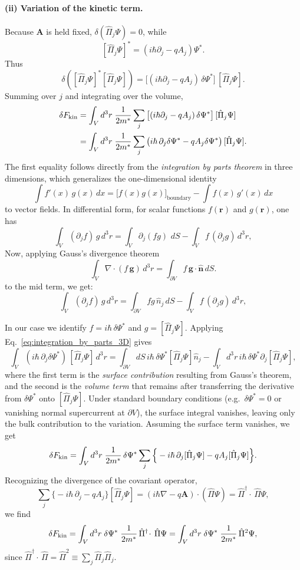 \paragraph{(ii) Variation of the kinetic term.}
Because $\mathbf A$ is held fixed, $\delta(\hat\Pi_j\Psi)=0$, while
\[
[\hat\Pi_j \Psi]^* = (i\hbar \partial_j - q A_j)\Psi^* .
\]
Thus
\[
\delta \left( [\hat\Pi_j\Psi]^* [\hat\Pi_j\Psi] \right)
= \big[(i\hbar \partial_j - q A_j)\,\delta\Psi^*\big]\,[\hat\Pi_j\Psi].
\]
Summing over $j$ and integrating over the volume,
\begin{align}
\delta F_{\rm kin}
&= \int_V d^3r \; \frac{1}{2m^*} \sum_j
\big[(i\hbar \partial_j - q A_j)\,\delta\Psi^*\big]\,[\hat\Pi_j\Psi]  \nonumber \\
&= \int_V d^3r \; \frac{1}{2m^*} \sum_j \big( i\hbar\,\partial_j \delta\Psi^* - q A_j  \delta\Psi^* \big)\,[\hat\Pi_j\Psi]. \nonumber
\end{align}
The first equality follows directly from the \textit{integration by parts theorem} in three dimensions,
which generalizes the one-dimensional identity
\[
\int f'(x)\, g(x)\,dx
= \big[f(x)g(x)\big]_{\text{boundary}} - \int f(x)\, g'(x)\,dx
\]
to vector fields. In differential form, for scalar functions $f(\mathbf r)$ and $g(\mathbf r)$, one has
\[
\int_V (\partial_j f)\, g\, d^3r
= \int_{ V} \partial_j(f g)\,\, dS
- \int_V f\, (\partial_j g)\, d^3r,
\]
Now, applying Gauss's divergence theorem
\[
\int_V \nabla\!\cdot(f\,\mathbf{g})\,d^3r
= \int_{\partial V} f\,\mathbf{g}\cdot \hat{\mathbf n}\,dS.
\]
to the mid term, we get: 
\begin{equation}
\int_V (\partial_j f)\, g\, d^3r
= \int_{\partial V} f g\, \hat n_j\, dS
- \int_V f\, (\partial_j g)\, d^3r,
\label{eq:integration_by_parts_3D}
\end{equation}


In our case we identify $f = i\hbar\,\delta\Psi^*$ and $g = [\hat\Pi_j\Psi]$.
Applying Eq.~\eqref{eq:integration_by_parts_3D} gives
\[
\int_V (i\hbar\,\partial_j \delta\Psi^*)\, [\hat\Pi_j\Psi]\, d^3r
= \int_{\partial V} dS\, i\hbar\, \delta\Psi^* [\hat\Pi_j\Psi]\hat n_j
- \int_V d^3r\, i\hbar\, \delta\Psi^* \partial_j[\hat\Pi_j\Psi],
\]
where the first term is the \emph{surface contribution} resulting from Gauss’s theorem,
and the second is the \emph{volume term} that remains after transferring the derivative
from $\delta\Psi^*$ onto $[\hat\Pi_j\Psi]$.
Under standard boundary conditions (e.g.\ $\delta\Psi^* = 0$ or vanishing normal supercurrent at $\partial V$),
the surface integral vanishes, leaving only the bulk contribution to the variation.
Assuming the surface term vanishes, we get
\[
\delta F_{\rm kin}
= \int_V d^3r\; \frac{1}{2m^*}\,\delta\Psi^*
\sum_j \Big\{- i\hbar \,\partial_j[\hat\Pi_j\Psi] - q A_j [\hat\Pi_j\Psi]\Big\}.
\]
Recognizing the divergence of the covariant operator,
\[
\sum_j \Big\{- i\hbar \,\partial_j - q A_j\Big\} [\hat\Pi_j\Psi]
= (i\hbar\nabla - q\mathbf A)\cdot(\hat\Pi\Psi)
= \hat\Pi^\dagger \!\cdot\, \hat\Pi \Psi,
\]
we find
\[
\delta F_{\rm kin} = \int_V d^3r\; \delta\Psi^*\;
\frac{1}{2m^*}\, \hat\Pi^\dagger \!\cdot\, \hat\Pi \Psi
= \int_V d^3r\; \delta\Psi^*\;
\frac{1}{2m^*}\, \hat\Pi^2 \Psi,
\]
since $\hat\Pi^\dagger \!\cdot\, \hat\Pi = \hat\Pi^2 \equiv \sum_j \hat\Pi_j \hat\Pi_j$.

